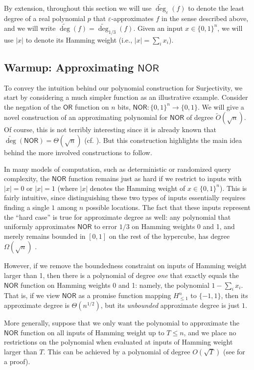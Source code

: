 \documentclass[11pt, letterpaper, fleqn]{article}
\theoremstyle{plain}
\newcommand{\Surjectivity}{Surjectivity}
\newcommand{\OR}{\mathsf{ OR}}
\newcommand{\NOR}{\mathsf{ NOR}}
\newcommand{\bits}{\{-1,1\}}
\newcommand{\B}{\{0,1\}}
\newcommand{\eps}{\varepsilon}
\newcommand{\adeg}{\widetilde{\operatorname{deg}}}
\begin{document}
By extension, throughout this section we will use $\adeg_\eps(f)$ to denote the least degree of a real polynomial $p$ that $\eps$-approximates $f$ in the sense described above, and we will write $\adeg(f) = \adeg_{1/3}(f)$. Given an input $x \in \B^n$,
we will use $|x|$ to denote its Hamming weight (i.e., $|x| = \sum_i x_i$).

\subsection{Warmup: Approximating \texorpdfstring{$\NOR$}{NOR}}
\label{s:warmup}
To convey the intuition behind our polynomial construction for \Surjectivity, we start by considering a much simpler function as an illustrative example. 
Consider the negation of the $\OR$ function on $n$ bits, $\NOR \colon \B^n\to\B$. 
We will give a novel construction of an approximating polynomial for $\NOR$ of degree $\tilde{O}(\sqrt{n})$. 
Of course, this is not terribly interesting since it is already known that $\adeg(\NOR) = \Theta(\sqrt{n})$ (cf. ). But this construction highlights the main idea behind the more involved constructions to follow.

In many models of computation, such as deterministic or randomized query complexity, the $\NOR$ function remains just as hard if we restrict to inputs with $|x|=0$ or $|x|=1$ (where $|x|$ denotes the Hamming weight of $x\in\B^n$). 
This is fairly intuitive, since distinguishing these two types of inputs essentially requires finding a single $1$ among $n$ possible locations. 
The fact that these inputs represent the ``hard case'' is true for approximate degree as well:
any polynomial that uniformly approximates $\NOR$ to error $1/3$ on Hamming weights 0 and 1, and merely remains bounded in $[0,1]$ on the rest of the hypercube, has degree $\Omega(\sqrt{n})$ \cite{nisanszegedy}. 

However, if we remove the boundedness constraint on inputs of Hamming weight larger than 1, then there is a polynomial of degree \emph{one} that exactly equals the $\NOR$ function on Hamming weights 0 and 1: namely, the polynomial  $1-\sum_{i} x_i$. That is, if we view $\NOR$ as a promise function mapping ${H}_{\leq 1}^n$ to $\bits$, then its approximate degree is $\Theta(n^{1/2})$, but its \emph{unbounded}
approximate degree is just $1$. 

More generally, suppose that we only want the polynomial to approximate the $\NOR$ function on all inputs of Hamming weight up to $T\leq n$, and we place no restrictions on the polynomial when evaluated at inputs of Hamming weight larger than $T$. This can be achieved by a polynomial of degree $O(\sqrt{T})$ (see  for a proof). 
\end{document}
